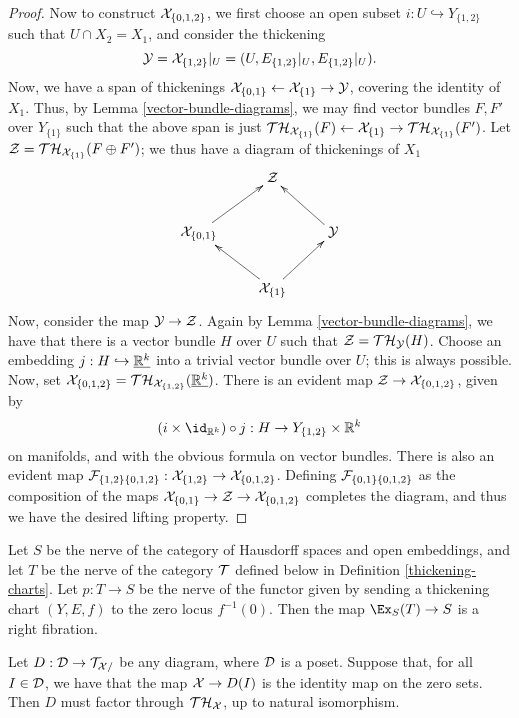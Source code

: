 \begin{proof}
Now to construct $\mathcal X_{\{0,1,2\}}$, we first choose an open subset $i: U \hookrightarrow Y_{\{1,2\}}$ such that $U \cap X_2 = X_1$, and consider the thickening
\[ \mathcal Y = {\mathcal X_{\{1,2\}}|_{U}} = (U, {E_{\{1,2\}}|_{U}}, {E_{\{1,2\}}|_{U}}). \]
Now, we have a span of thickenings $\mathcal X_{\{0,1\}} \leftarrow \mathcal X_{\{1\}} \to \mathcal Y$, covering the identity of $X_1$. Thus, by Lemma \ref{vector-bundle-diagrams}, we may find vector bundles $F, F'$ over $Y_{\{1\}}$ such that the above span is just ${\mathcal T \mathcal H}_{\mathcal X_{\{1\}}}(F) \leftarrow \mathcal X_{\{1\}} \to {\mathcal T\mathcal H}_{\mathcal X_{\{1\}}}(F')$. Let $\mathcal Z = {\mathcal T \mathcal H}_{\mathcal X_{\{1\}}}(F \oplus F')$; we thus have a diagram of thickenings of $X_1$
\[\xymatrix{
& \cZ & \\
\cX_{\{0, 1\}} \ar[ur] & & \cY \ar[ul] \\
& \cX_{\{1\}} \ar[ul] \ar[ur] &
}\]
Now, consider the map $\mathcal Y \to \mathcal Z$. Again by Lemma \ref{vector-bundle-diagrams}, we have that there is a vector bundle $H$ over $U$ such that $\mathcal Z = {\mathcal T \mathcal H}_\mathcal Y(H)$. Choose an embedding $j: H \hookrightarrow \underline{\mathbb R^k}$ into a trivial vector bundle over $U$; this is always possible. Now, set $\mathcal X_{\{0,1,2\}} = {\mathcal T \mathcal H}_{\mathcal X_{\{1,2\}}}(\underline{\mathbb R^k})$. There is an evident map $\mathcal Z \to \mathcal X_{\{0,1,2\}}$, given by
\[ (i \times \id_{\RR^k}) \circ j : H \to Y_{\{1,2\}} \times \RR^k \]
on manifolds, and with the obvious formula on vector bundles. There is also an evident map $\mathcal F_{\{1,2\}\{0,1,2\}}: \mathcal X_{\{1, 2\}} \to \mathcal X_{\{0,1,2\}}$. Defining $\mathcal F_{\{0,1\}\{0,1,2\}}$ as the composition of the maps $\mathcal X_{\{0,1\}} \to \mathcal Z \to \mathcal X_{\{0,1,2\}}$ completes the diagram, and thus we have the desired lifting property.


\end{proof}


\begin{prop}\label{presheaf-of-implicit-structures}
 Let $S$ be the nerve of the category of Hausdorff spaces and open embeddings, and let $T$ be the nerve of the category $\mathcal T$ defined below in Definition \ref{thickening-charts}. Let $p: T \to S$ be the nerve of the functor given by sending a thickening chart $(Y, E, f)$ to the zero locus $f^{-1}(0)$. Then the map $\Ex_S(T) \to S$ is a right fibration.
\end{prop}

\begin{lemma}\label{vector-bundle-diagrams}
Let $D: \mathcal D \to \mathcal T_{\mathcal X /}$ be any diagram, where $\mathcal D$ is a poset. Suppose that, for all $I \in \mathcal D$, we have that the map $\mathcal X \to D(I)$ is the identity map on the zero sets. Then $D$ must factor through ${\mathcal T \mathcal H}_\mathcal X$, up to natural isomorphism.
\end{lemma}

